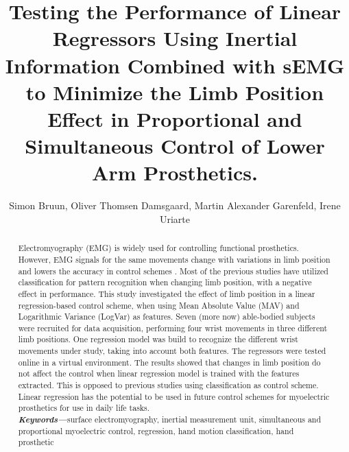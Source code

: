 \documentclass[a4paper, 10pt, conference]{ieeeconf}      %
\title{\LARGE \bf
	Testing the Performance of Linear Regressors Using Inertial Information Combined with sEMG to Minimize the Limb Position Effect in Proportional and Simultaneous Control of Lower Arm Prosthetics.
}%
\author{Simon Bruun, Oliver Thomsen Damsgaard, Martin Alexander Garenfeld, Irene Uriarte}%
\begin{document}
	
	
	
	\maketitle
	\thispagestyle{empty}
	\pagestyle{empty}
	
	
	\begin{abstract}
Electromyography (EMG) is widely used for controlling functional prosthetics. However, EMG signals for the same movements change with variations in limb position and lowers the accuracy in control schemes \cite{fougner2012}. Most of the previous studies have utilized classification for pattern recognition when changing limb position, with a negative effect in performance. %
This study investigated the effect of limb position in a linear regression-based control scheme, when using 
Mean Absolute Value (MAV) and Logarithmic Variance (LogVar) as features. %
Seven (more now) able-bodied subjects were recruited for data acquisition, performing four wrist movements in three different limb positions. One regression model was build to recognize the different wrist movements under study, taking into account both features. %
The regressors were tested online in a virtual environment. %
The results showed that changes in limb position do not affect the control when linear regression model is trained with the %
features extracted. This is opposed to previous studies using classification as control scheme. Linear regression has the potential to be used in future control schemes for myoelectric prosthetics for use in daily life tasks.\\


\textit{\textbf{Keywords---}}surface electromyography, inertial measurement unit, simultaneous and proportional myoelectric control, regression, hand motion classification, hand prosthetic


	\end{abstract}
	
\end{document}
